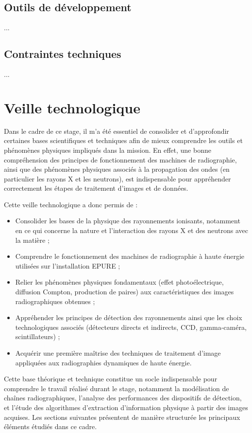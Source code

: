 \documentclass[12pt,a4paper]{report}
\begin{document}
\section{Outils de développement}
... %

\section{Contraintes techniques}
... %

\chapter{Veille technologique}
Dans le cadre de ce stage, il m’a été essentiel de consolider et d’approfondir certaines bases scientifiques et techniques afin de mieux comprendre les outils et phénomènes physiques impliqués dans la mission. En effet, une bonne compréhension des principes de fonctionnement des machines de radiographie, ainsi que des phénomènes physiques associés à la propagation des ondes (en particulier les rayons X et les neutrons), est indispensable pour appréhender correctement les étapes de traitement d’images et de données.

Cette veille technologique a donc permis de :
\begin{itemize}
  \item Consolider les bases de la physique des rayonnements ionisants, notamment en ce qui concerne la nature et l’interaction des rayons X et des neutrons avec la matière ;
  \item Comprendre le fonctionnement des machines de radiographie à haute énergie utilisées sur l’installation EPURE ;
  \item Relier les phénomènes physiques fondamentaux (effet photoélectrique, diffusion Compton, production de paires) aux caractéristiques des images radiographiques obtenues ;
  \item Appréhender les principes de détection des rayonnements ainsi que les choix technologiques associés (détecteurs directs et indirects, CCD, gamma-caméra, scintillateurs) ;
  \item Acquérir une première maîtrise des techniques de traitement d’image appliquées aux radiographies dynamiques de haute énergie.
\end{itemize}

Cette base théorique et technique constitue un socle indispensable pour comprendre le travail réalisé durant le stage, notamment la modélisation de chaînes radiographiques, l’analyse des performances des dispositifs de détection, et l’étude des algorithmes d’extraction d’information physique à partir des images acquises. Les sections suivantes présentent de manière structurée les principaux éléments étudiés dans ce cadre.
\end{document}
